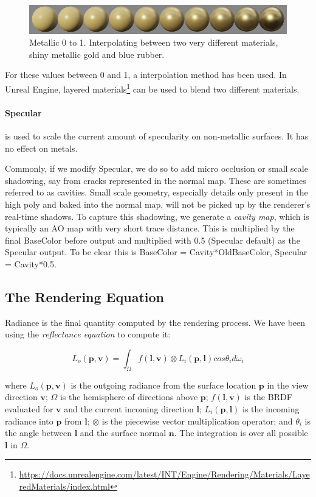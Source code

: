 \begin{figure}\label{f:material-metallic}
\sidecaption
	\includegraphics[width=1.\textwidth]{graphics/gi/metallic}
\caption{Metallic 0 to 1. Interpolating between two very different materials, shiny metallic gold and blue rubber.}
\end{figure}

For these values between 0 and 1, a interpolation method has been used. In Unreal Engine, layered materials\footnote{\url{https://docs.unrealengine.com/latest/INT/Engine/Rendering/Materials/LayeredMaterials/index.html}} can be used to blend two different materials.


\paragraph{\textbf{Specular}} is used to scale the current amount of specularity on non-metallic surfaces. It has no effect on metals.

Commonly, if we modify Specular, we do so to add micro occlusion or small scale shadowing, say from cracks represented in the normal map. These are sometimes referred to as cavities. Small scale geometry, especially details only present in the high poly and baked into the normal map, will not be picked up by the renderer's real-time shadows. To capture this shadowing, we generate a \textit{cavity map}, which is typically an AO map with very short trace distance. This is multiplied by the final BaseColor before output and multiplied with 0.5 (Specular default) as the Specular output. To be clear this is BaseColor = Cavity*OldBaseColor, Specular = Cavity*0.5.


\subsection{The Rendering Equation}
Radiance is the final quantity computed by the rendering process. We have been using the \textit{reflectance equation} to compute it:

\begin{equation}
	L_o(\mathbf{p},\mathbf{v})=\int_{\Omega}f(\mathbf{l},\mathbf{v})\otimes L_i(\mathbf{p},\mathbf{l})cos\theta_i d\omega_i
\end{equation}

where $L_o(\mathbf{p},\mathbf{v})$ is the outgoing radiance from the surface location $\mathbf{p}$ in the view direction $\mathbf{v}$; $\Omega$ is the hemisphere of directions above $\mathbf{p}$; $f(\mathbf{l},\mathbf{v})$ is the BRDF evaluated for $\mathbf{v}$ and the current incoming direction $\mathbf{l}$; $L_i(\mathbf{p},\mathbf{l})$ is the incoming radiance into $\mathbf{p}$ from $\mathbf{l}$; $\otimes$ is the piecewise vector multiplication operator; and $\theta_i$ is the angle between $\mathbf{l}$ and the surface normal $\mathbf{n}$. The integration is over all possible $\mathbf{l}$ in $\Omega$.

